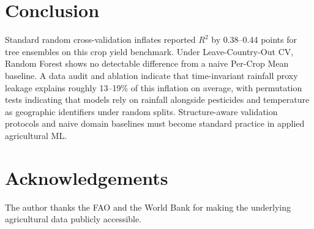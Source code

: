 \documentclass[conference]{IEEEtran}
\begin{document}
\section{Conclusion}
\label{sec:conclusion}

Standard random cross-validation inflates reported $R^2$ by 0.38--0.44 points 
for tree ensembles on this crop yield benchmark. Under Leave-Country-Out CV, 
Random Forest shows no detectable difference from a naive Per-Crop Mean baseline. 
A data audit and ablation indicate that time-invariant rainfall proxy leakage explains 
roughly 13--19\% of this inflation on average, with permutation tests indicating that 
models rely on rainfall alongside pesticides and temperature as geographic identifiers 
under random splits. Structure-aware validation protocols and naive domain baselines 
must become standard practice in applied agricultural ML.

\section*{Acknowledgements}
The author thanks the FAO and the World Bank for making the underlying agricultural 
data publicly accessible.



\end{document}
